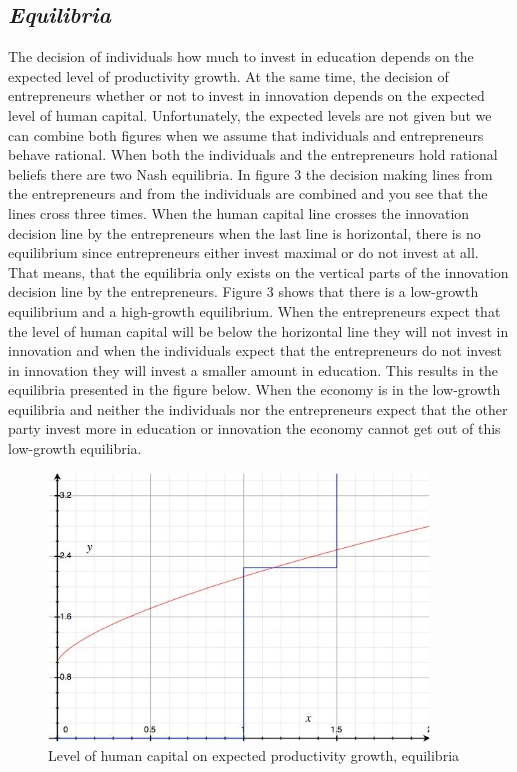 \documentclass[a4paper,11pt]{article} %
\begin{document}
\subsection*{\textit{Equilibria}}
The decision of individuals how much to invest in education depends on the expected level of productivity growth. At the same time, the decision of entrepreneurs whether or not to invest in innovation depends on the expected level of human capital. Unfortunately, the expected levels are not given but we can combine both figures when we assume that individuals and entrepreneurs behave rational. When both the individuals and the entrepreneurs hold rational beliefs there are two Nash equilibria. In figure 3 the decision making lines from the entrepreneurs and from the individuals are combined and you see that the lines cross three times. When the human capital line crosses the innovation decision line by the entrepreneurs when the last line is horizontal, there is no equilibrium since entrepreneurs either invest maximal or do not invest at all. That means, that the equilibria only exists on the vertical parts of the innovation decision line by the entrepreneurs. Figure 3 shows that there is a low-growth equilibrium and a high-growth equilibrium. When the entrepreneurs expect that the level of human capital will be below the horizontal line they will not invest in innovation and when the individuals expect that the entrepreneurs do not invest in innovation they will invest a smaller amount in education. This results in the equilibria presented in the figure below. When the economy is in the low-growth equilibria and neither the individuals nor the entrepreneurs expect that the other party invest more in education or innovation the economy cannot get out of this low-growth equilibria. 

\begin{figure}
  \centering
  \includegraphics[width=0.9\textwidth]{figure3.png}
  \caption{Level of human capital on expected productivity growth, equilibria}
\end{figure}
\end{document}
